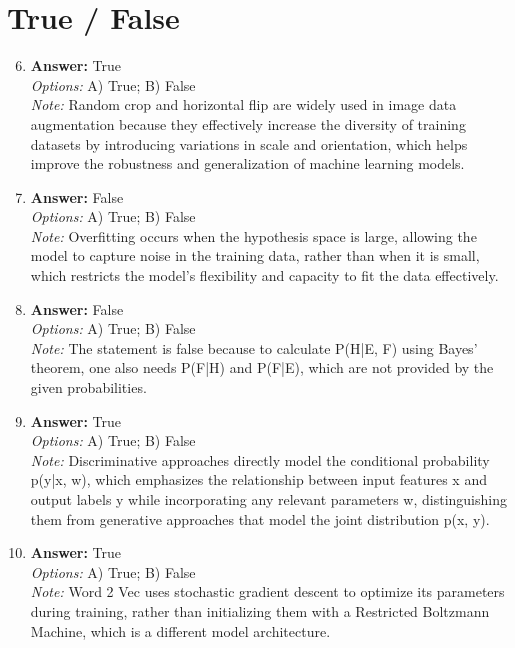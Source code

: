 \documentclass[12pt]{article}
\begin{document}
\section*{True / False}
\begin{enumerate}[label=\arabic*.]
\setcounter{enumi}{5}
\item \textbf{Answer:} True
\\ \textit{Options:} A) True; B) False
\\ \textit{Note:} Random crop and horizontal flip are widely used in image data augmentation because they effectively increase the diversity of training datasets by introducing variations in scale and orientation, which helps improve the robustness and generalization of machine learning models.
\item \textbf{Answer:} False
\\ \textit{Options:} A) True; B) False
\\ \textit{Note:} Overfitting occurs when the hypothesis space is large, allowing the model to capture noise in the training data, rather than when it is small, which restricts the model's flexibility and capacity to fit the data effectively.
\item \textbf{Answer:} False
\\ \textit{Options:} A) True; B) False
\\ \textit{Note:} The statement is false because to calculate P(H|E, F) using Bayes' theorem, one also needs P(F|H) and P(F|E), which are not provided by the given probabilities.
\item \textbf{Answer:} True
\\ \textit{Options:} A) True; B) False
\\ \textit{Note:} Discriminative approaches directly model the conditional probability p(y|x, w), which emphasizes the relationship between input features x and output labels y while incorporating any relevant parameters w, distinguishing them from generative approaches that model the joint distribution p(x, y).
\item \textbf{Answer:} True
\\ \textit{Options:} A) True; B) False
\\ \textit{Note:} Word 2 Vec uses stochastic gradient descent to optimize its parameters during training, rather than initializing them with a Restricted Boltzmann Machine, which is a different model architecture.
\end{enumerate}
\end{document}
